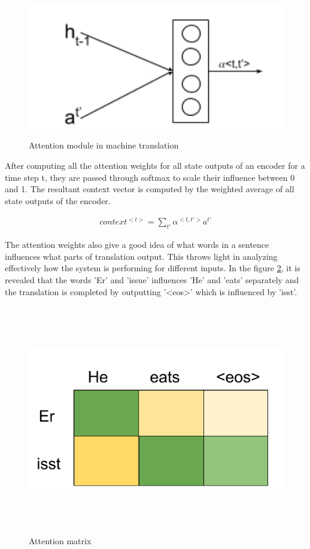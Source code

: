 \documentclass[a4paper, 11pt]{article}
\begin{document}
\begin{figure}[H]
    \centering
    \includegraphics[width=\textwidth,height=6cm,keepaspectratio=true]
    {attention-networks-2.png}
    \caption{
        Attention module in machine translation 
    }
    \label{fig:attention-networks-2}
\end{figure}

After computing all the attention weights for all state outputs of an encoder for a time step t, they are passed through softmax to scale their influence between 0 and 1. The resultant context vector is computed by the weighted average of all state outputs of the encoder.

\begin{align*}
context^{<t>} = \sum_{t'} \alpha^{<t,t'>} a^{t'}
\end{align*} 
 
The attention weights also give a good idea of what words in a sentence influences what parts of translation output. This throws light in analyzing effectively how the system is performing for different inputs. In the figure \ref{fig:attention-matrix-1}, it is revealed that the words 'Er' and 'issue' influences 'He' and 'eats' separately and the translation is completed by outputting '<eos>' which is influenced by 'isst'.

\begin{figure}[H]
    \centering
    \includegraphics[width=\textwidth,height=10cm,keepaspectratio=true]
    {attention-matrix-1.png}
    \caption{
        Attention matrix 
    }
    \label{fig:attention-matrix-1}
\end{figure}
\end{document}
